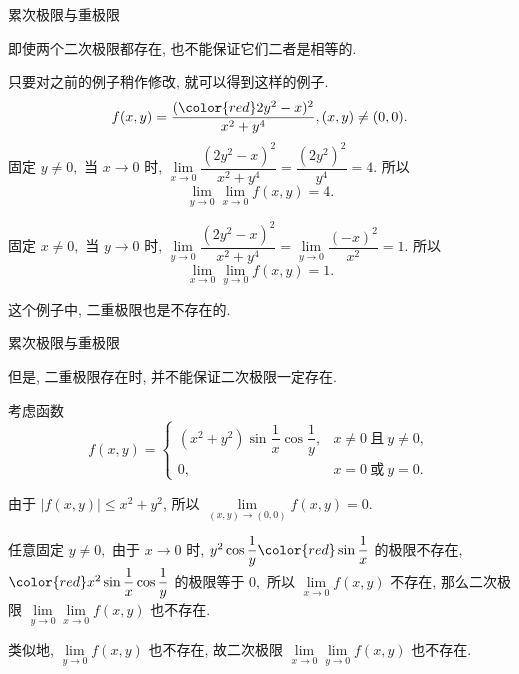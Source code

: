 
\begin{frame}{累次极限与重极限}

即使两个二次极限都存在, 也不能保证它们二者是相等的.

\pause

\begin{eg}
只要对之前的例子稍作修改, 就可以得到这样的例子.
\pause
\[f(x, y) = \dfrac{({\color{red}2} y^2 - x)^2}{x^2 + y^4}, (x, y) \neq (0, 0).\]
\pause
固定 $y \neq 0,$ 当 $x \to 0$ 时, $\lim\limits_{x \to 0} \dfrac{(2y^2 - x)^2}{x^2 + y^4} = \dfrac{(2y^2)^2}{y^4} = 4.$ 所以
\[\lim\limits_{y \to 0} \lim\limits_{x \to 0} f(x, y) = 4.\]

\pause
\vspace*{-0.5em}

固定 $x \neq 0,$ 当 $y \to 0$ 时, $\lim\limits_{y \to 0} \dfrac{(2y^2 - x)^2}{x^2 + y^4} = \lim\limits_{y \to 0} \dfrac{(- x)^2}{x^2} = 1.$ 所以
\[\lim\limits_{x \to 0} \lim\limits_{y \to 0} f(x, y) = 1.\]

\pause
\vspace*{-0.5em}

这个例子中, 二重极限也是不存在的.
\end{eg}

\end{frame}


\begin{frame}{累次极限与重极限}

但是, 二重极限存在时, 并不能保证二次极限一定存在.

\pause

\begin{eg}
考虑函数
\[f(x, y) = \begin{cases}
(x^2 + y^2) \sin\dfrac{1}{x} \cos\dfrac{1}{y}, & x \neq 0 ~ \text{且} ~ y \neq 0, \\
0, & x = 0 ~ \text{或} ~ y = 0.
\end{cases}\]

\pause

由于 $\lvert f(x, y) \rvert \leqslant x^2 + y^2$, 所以 $\lim\limits_{(x,y) \to (0,0)} f(x, y) = 0.$

\pause
\vspace{0.5em}

任意固定 $y\neq 0,$ 由于 $x \to 0$ 时, $y^2\cos\dfrac{1}{y}{\color{red}\sin\dfrac{1}{x}}$ 的极限不存在, ${\color{red}x^2\sin\dfrac{1}{x}}\cos\dfrac{1}{y}$ 的极限等于 $0,$ 所以 $\lim\limits_{x \to 0} f(x, y)$ 不存在, 那么二次极限 $\lim\limits_{y \to 0} \lim\limits_{x \to 0} f(x, y)$ 也不存在.

\pause
\vspace{0.5em}

类似地, $\lim\limits_{y \to 0} f(x, y)$ 也不存在, 故二次极限 $\lim\limits_{x \to 0} \lim\limits_{y \to 0} f(x, y)$ 也不存在.
\end{eg}

\end{frame}

